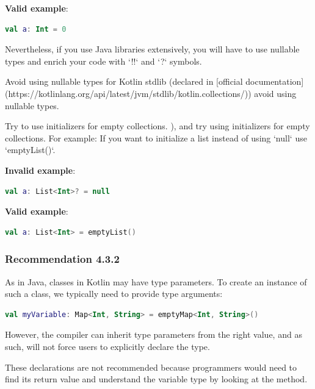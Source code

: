 {{{{\textbf{Valid example}:

\begin{lstlisting}[language=Kotlin]
val a: Int = 0
\end{lstlisting}


Nevertheless, if you use Java libraries extensively, you will have to use nullable types and enrich your code with `!!` and `?` symbols.

Avoid using nullable types for Kotlin stdlib (declared in [official documentation](https://kotlinlang.org/api/latest/jvm/stdlib/kotlin.collections/)) avoid using nullable types. 

Try to use initializers for empty collections. ), and try using initializers for empty collections. For example: If you want to initialize a list instead of using `null` use `emptyList()`.



\textbf{Invalid example}:

\begin{lstlisting}[language=Kotlin]
val a: List<Int>? = null 
\end{lstlisting}


\textbf{Valid example}:

\begin{lstlisting}[language=Kotlin]
val a: List<Int> = emptyList()
\end{lstlisting}


\subsubsection*{\textbf{Recommendation 4.3.2}}
\leavevmode\newline

As in Java, classes in Kotlin may have type parameters. To create an instance of such a class, we typically need to provide type arguments:



\begin{lstlisting}[language=Kotlin]
val myVariable: Map<Int, String> = emptyMap<Int, String>() 
\end{lstlisting}


However, the compiler can inherit type parameters from the right value, and as such, will not force users to explicitly declare the type.

These declarations are not recommended because programmers would need to find its return value and understand the variable type by looking at the method.



}}}}
